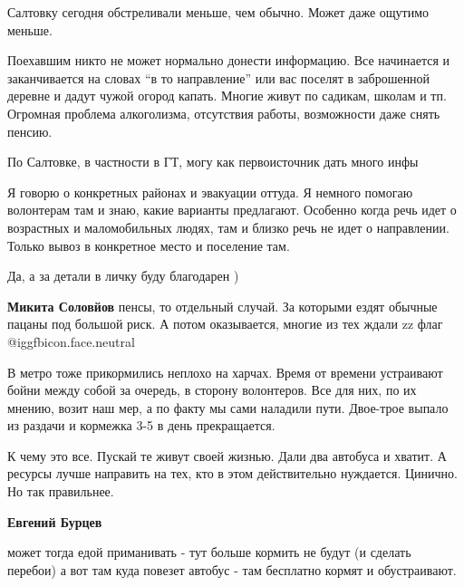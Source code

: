  
 
 
 
 
\zzSecCmt

\begin{itemize} %

Салтовку сегодня обстреливали меньше, чем обычно. Может даже ощутимо меньше.

Поехавшим никто не может нормально донести информацию. Все начинается и
заканчивается на словах \enquote{в то направление} или вас поселят в
заброшенной деревне и дадут чужой огород капать. Многие живут по садикам,
школам и тп.  Огромная проблема алкоголизма, отсутствия работы, возможности
даже снять пенсию.

По Салтовке, в частности в ГТ, могу как первоисточник дать много инфы

\begin{itemize} %

Я говорю о конкретных районах и эвакуации оттуда. Я немного помогаю волонтерам
там и знаю, какие варианты предлагают. Особенно когда речь идет о возрастных и
маломобильных людях, там и близко речь не идет о направлении. Только вывоз в
конкретное место и поселение там.

Да, а за детали в личку буду благодарен )

\textbf{Микита Соловйов} пенсы, то отдельный случай. За которыми ездят обычные пацаны
под большой риск. А потом оказывается, многие из тех ждали zz флаг @igg{fbicon.face.neutral} 

В метро тоже прикормились неплохо на харчах. Время от времени устраивают бойни
между собой за очередь, в сторону волонтеров. Все для них, по их мнению, возит
наш мер, а по факту мы сами наладили пути. Двое-трое выпало из раздачи и
кормежка 3-5 в день прекращается.

К чему это все. Пускай те живут своей жизнью. Дали два автобуса и хватит. А
ресурсы лучше направить на тех, кто в этом действительно нуждается. Цинично. Но
так правильнее.

\textbf{Евгений Бурцев} 

может тогда едой приманивать - тут больше кормить не будут (и сделать перебои)
а вот там куда повезет автобус - там бесплатно кормят и обустраивают.


\end{itemize}
\end{itemize}
